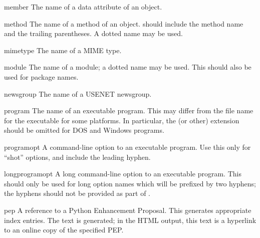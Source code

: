 \documentclass{howto}
\begin{document}
    \begin{macrodesc}{member}{}
      The name of a data attribute of an object.
    \end{macrodesc}

    \begin{macrodesc}{method}{}
      The name of a method of an object.   should include the
      method name and the trailing parentheses.  A dotted name may be
      used.
    \end{macrodesc}

    \begin{macrodesc}{mimetype}{}
      The name of a MIME type.
    \end{macrodesc}

    \begin{macrodesc}{module}{}
       The name of a module; a dotted name may be used.  This should
       also be used for package names.
    \end{macrodesc}

    \begin{macrodesc}{newsgroup}{}
      The name of a USENET newsgroup.
    \end{macrodesc}

    \begin{macrodesc}{program}{}
      The name of an executable program.  This may differ from the
      file name for the executable for some platforms.  In particular, 
      the  (or other) extension should be omitted for DOS
      and Windows programs.
    \end{macrodesc}

    \begin{macrodesc}{programopt}{}
      A command-line option to an executable program.  Use this only
      for ``shot'' options, and include the leading hyphen.
    \end{macrodesc}

    \begin{macrodesc}{longprogramopt}{}
      A long command-line option to an executable program.  This
      should only be used for long option names which will be prefixed
      by two hyphens; the hyphens should not be provided as part of
      .
    \end{macrodesc}

    \begin{macrodesc}{pep}{}
      A reference to a Python Enhancement Proposal.  This generates
      appropriate index entries.  The text  is
      generated; in the HTML output, this text is a hyperlink to an
      online copy of the specified PEP.
    \end{macrodesc}
\end{document}
